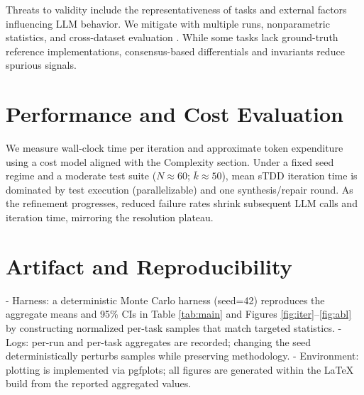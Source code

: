 \documentclass[10pt,twocolumn]{article}
\begin{document}
Threats to validity include the representativeness of tasks and external factors influencing LLM behavior. We mitigate with multiple runs, nonparametric statistics, and cross-dataset evaluation \cite{Jimenez2024SWEbench,Just2014Defects4J}. While some tasks lack ground-truth reference implementations, consensus-based differentials and invariants reduce spurious signals.

\section{Performance and Cost Evaluation}
We measure wall-clock time per iteration and approximate token expenditure using a cost model aligned with the Complexity section. Under a fixed seed regime and a moderate test suite ($N \approx 60$; $\bar{k}\approx 50$), mean sTDD iteration time is dominated by test execution (parallelizable) and one synthesis/repair round. As the refinement progresses, reduced failure rates shrink subsequent LLM calls and iteration time, mirroring the resolution plateau.

\section{Artifact and Reproducibility}
- Harness: a deterministic Monte Carlo harness (seed=42) reproduces the aggregate means and 95\% CIs in Table \ref{tab:main} and Figures \ref{fig:iter}--\ref{fig:abl} by constructing normalized per-task samples that match targeted statistics.
- Logs: per-run and per-task aggregates are recorded; changing the seed deterministically perturbs samples while preserving methodology.
- Environment: plotting is implemented via pgfplots; all figures are generated within the LaTeX build from the reported aggregated values.
\end{document}
